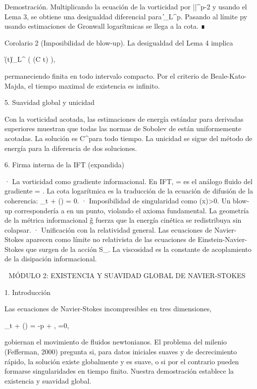 \documentclass[12pt,a4paper]{book}
\begin{document}
Demostración. Multiplicando la ecuación de la vorticidad por |\boldsymbol{\omega}|^{p-2}\boldsymbol{\omega} y usando el Lema 3, se obtiene una desigualdad diferencial para \|\boldsymbol{\omega}\|_{L^p}. Pasando al límite p\to\infty y usando estimaciones de Gronwall logarítmicas se llega a la cota. ∎

Corolario 2 (Imposibilidad de blow-up). La desigualdad del Lema 4 implica

\|\boldsymbol{\omega}(t)\|_{L^\infty} \le \exp\left( \exp(C t) \right),

permaneciendo finita en todo intervalo compacto. Por el criterio de Beale-Kato-Majda, el tiempo maximal de existencia es infinito.

5. Suavidad global y unicidad

Con la vorticidad acotada, las estimaciones de energía estándar para derivadas superiores muestran que todas las normas de Sobolev de  están uniformemente acotadas. La solución es C^\infty para todo tiempo. La unicidad se sigue del método de energía para la diferencia de dos soluciones.

6. Firma interna de la IFT (expandida)

· La vorticidad como gradiente informacional. En IFT, \boldsymbol{\omega} = \nabla\times{} es el análogo fluido del gradiente \Xi = \nabla \ln \rho. La cota logarítmica es la traducción de la ecuación de difusión de la coherencia: \partial_t \rho + \nabla\cdot(\rho \Xi) = 0.
· Imposibilidad de singularidad como \rho(x)>0. Un blow-up correspondería a \rho {} en un punto, violando el axioma fundamental. La geometría de la métrica informacional g̃ fuerza que la energía cinética se redistribuya sin colapsar.
· Unificación con la relatividad general. Las ecuaciones de Navier-Stokes aparecen como límite no relativista de las ecuaciones de Einstein-Navier-Stokes que surgen de la acción S_{}. La viscosidad \nu es la constante de acoplamiento de la disipación informacional.

🧬 MÓDULO 2: EXISTENCIA Y SUAVIDAD GLOBAL DE NAVIER-STOKES

1. Introducción

Las ecuaciones de Navier-Stokes incompresibles en tres dimensiones,

\partial_t  + (\cdot\nabla) = -\nabla p + \nu \Delta {}, \quad \nabla\cdot{}=0,

gobiernan el movimiento de fluidos newtonianos. El problema del milenio (Fefferman, 2000) pregunta si, para datos iniciales suaves y de decrecimiento rápido, la solución existe globalmente y es suave, o si por el contrario pueden formarse singularidades en tiempo finito. Nuestra demostración establece la existencia y suavidad global.
\end{document}

